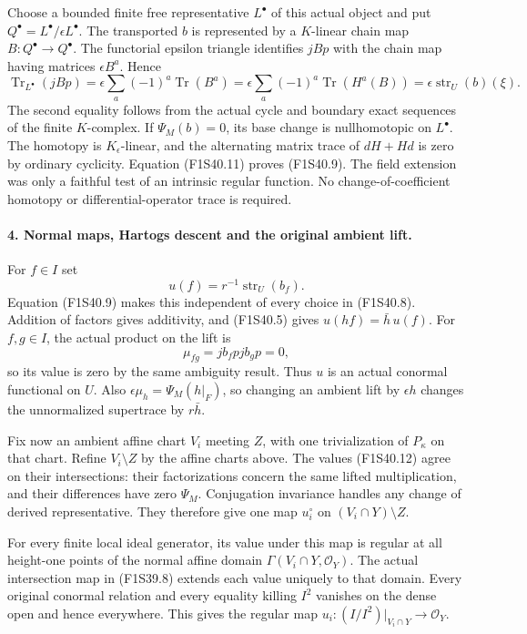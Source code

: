 Choose a bounded finite free representative
$L^\bullet$ of this actual object and put
$Q^\bullet=L^\bullet/\epsilon L^\bullet$.
The transported $b$ is represented by a $K$-linear
chain map $B:Q^\bullet\to Q^\bullet$.
The functorial epsilon triangle identifies $jBp$
with the chain map having matrices $\epsilon B^a$.
Hence
\[
 \operatorname{Tr}_{L^\bullet}(jBp)
    =\epsilon\sum_a(-1)^a\operatorname{Tr}(B^a)
    =\epsilon\sum_a(-1)^a\operatorname{Tr}(H^a(B))
    =\epsilon\operatorname{str}_U(b)(\xi).
 \tag{F1S40.11}
\]
The second equality follows from the actual cycle
and boundary exact sequences of the finite
$K$-complex. If $\Psi_M(b)=0$, its base change
is nullhomotopic on $L^\bullet$. The homotopy is
$K_\epsilon$-linear, and the alternating matrix
trace of $dH+Hd$ is zero by ordinary cyclicity.
Equation (F1S40.11) proves (F1S40.9).
The field extension was only a faithful test of an
intrinsic regular function. No change-of-coefficient
homotopy or differential-operator trace is required.

\paragraph{4. Normal maps, Hartogs descent and the original ambient lift.}
For $f\in I$ set
\[
                 u(f)=r^{-1}\operatorname{str}_U(b_f).
 \tag{F1S40.12}
\]
Equation (F1S40.9) makes this independent of every
choice in (F1S40.8). Addition of factors gives
additivity, and (F1S40.5) gives
$u(hf)=\bar h\,u(f)$.
For $f,g\in I$, the actual product on the lift is
\[
          \mu_{fg}=j b_f p j b_g p=0,
 \tag{F1S40.13}
\]
so its value is zero by the same ambiguity result.
Thus $u$ is an actual conormal functional on $U$.
Also $\epsilon\mu_h=\Psi_M(h|_F)$, so changing
an ambient lift by $\epsilon h$ changes the
unnormalized supertrace by $r\bar h$.

Fix now an ambient affine chart $V_i$ meeting $Z$,
with one trivialization of $P_\kappa$ on that chart.
Refine $V_i\setminus Z$ by the affine charts above.
The values (F1S40.12) agree on their intersections:
their factorizations concern the same lifted
multiplication, and their differences have zero
$\Psi_M$. Conjugation invariance handles any change
of derived representative. They therefore give
one map $u_i^\circ$ on $(V_i\cap Y)\setminus Z$.

For every finite local ideal generator, its value
under this map is regular at all height-one points
of the normal affine domain $\Gamma(V_i\cap Y,\mathcal O_Y)$.
The actual intersection map in (F1S39.8) extends each
value uniquely to that domain. Every original
conormal relation and every equality killing $I^2$
vanishes on the dense open and hence everywhere.
This gives the regular map
$u_i:(I/I^2)|_{V_i\cap Y}\to\mathcal O_Y$.

